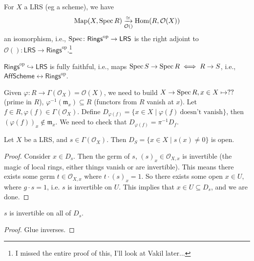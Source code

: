 \begin{theorem}
    For $X$ a LRS (eg a scheme), we have 
    \[
        \mathrm{Map}(X,\operatorname{Spec} R) \underset{\mathcal{O} ( )}{\xrightarrow{\simeq }}  \operatorname{Hom} (R, \mathcal{O} (X))
    \] an isomorphism, i.e., $\operatorname{Spec} \colon \mathsf{Rings} ^{\mathrm{op}} \to \mathsf{LRS} $ is the right adjoint to $\mathcal{O} ( ) \colon \mathsf{LRS}  \to \mathsf{Rings} ^{\mathrm{op}}$.\footnote{I missed the entire proof of this, I'll look at Vakil later...}
\end{theorem}
\begin{cor}
    $\mathsf{Rings} ^{\mathrm{op}}\hookrightarrow \mathsf{LRS} $ is fully faithful, i.e., maps $\operatorname{Spec} S \to \operatorname{Spec} R \iff R \to S$, i.e., $\mathsf{AffScheme} \leftrightarrow \mathsf{Rings} ^{\mathrm{op}}$.
\end{cor}
Given $\varphi  \colon R \to \Gamma (\mathcal{O} _X) = \mathcal{O} (X)$, we need to build $X \to \operatorname{Spec} R, x\in X \mapsto  ?? $ (prime in $R$), $\varphi  ^{-1} (\mathfrak m_x) \subseteq R$ (functors from $R$ vanish at $x$). Let $f \in R, \varphi (f) \in \Gamma (\mathcal{O} _X)$. Define $D _{\varphi (f)}= \{x \in X \mid  \varphi (f) \ \text{doesn't vanish} \} $, then $( \varphi (f))_x \notin \mathfrak m_x$. We need to check that $D_{\varphi (f)}= \pi ^{-1} D_f$.

\begin{lemma}
    Let $X$ be a LRS, and $s \in \Gamma( \mathcal{O} _X)$. Then $D_S= \{ x \in X \mid s(x)\neq 0\} $ is open.
\end{lemma}
\begin{proof}
    Consider $x \in D_s$. Then the germ of $s$, $(s)_x \in \mathcal{O} _{X,x}$ is invertible (the magic of local rings, either things vanish or are invertible). This means there exists some germ $t \in \mathcal{O}_{X,x}$ where $t \cdot (s)_x=1$. So there exists some open $x \in U,$ where $g \cdot s=1$, i.e. $s$ is invertible on $U$. This implies that $x \in U \subseteq D_s$, and we are done.
\end{proof}
\begin{cor}
    $s$ is invertible on all of $D_s$.
\end{cor}
\begin{proof}
    Glue inverses.
\end{proof}

